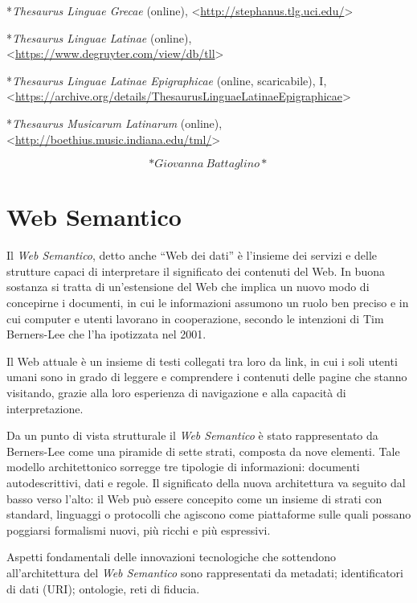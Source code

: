 \documentclass[
  b5paper,
  twoside,
  12pt,
  chapterprefix=false,
  bibliography=totocnumbered,
  parskip=false]{scrbook}
\begin{document}
*\emph{Thesaurus Linguae Grecae} (online),
\textless{}\href{http://stephanus.tlg.uci.edu/}{{http://stephanus.tlg.uci.edu/}}\textgreater{}

*\emph{Thesaurus Linguae Latinae} (online),
\textless{}\href{https://www.degruyter.com/view/db/tll}{{https://www.degruyter.com/view/db/tll}}\textgreater{}

*\emph{Thesaurus Linguae Latinae Epigraphicae} (online, scaricabile), I,
\textless{}\href{https://archive.org/details/ThesaurusLinguaeLatinaeEpigraphicae}{{https://archive.org/details/ThesaurusLinguaeLatinaeEpigraphicae}}\textgreater{}

*\emph{Thesaurus Musicarum Latinarum} (online),
\textless{}\href{http://boethius.music.indiana.edu/tml/}{{http://boethius.music.indiana.edu/tml/}}\textgreater{}

\[*Giovanna~Battaglino*\]

\hypertarget{web-semantico}{%
\chapter{Web Semantico}\label{web-semantico}}

Il \emph{Web Semantico}, detto anche \enquote{Web dei dati} è l'insieme dei servizi
e delle strutture capaci di interpretare il significato dei contenuti
del Web. In buona sostanza si tratta di un'estensione del Web che
implica un nuovo modo di concepirne i documenti, in cui le informazioni
assumono un ruolo ben preciso e in cui computer e utenti lavorano in
cooperazione, secondo le intenzioni di Tim Berners-Lee che l'ha
ipotizzata nel 2001.

Il Web attuale è un insieme di testi collegati tra loro da link, in cui
i soli utenti umani sono in grado di leggere e comprendere i contenuti
delle pagine che stanno visitando, grazie alla loro esperienza di
navigazione e alla capacità di interpretazione.

Da un punto di vista strutturale il \emph{Web Semantico} è stato
rappresentato da Berners-Lee come una piramide di sette strati, composta
da nove elementi. Tale modello architettonico sorregge tre tipologie di
informazioni: documenti autodescrittivi, dati e regole. Il significato
della nuova architettura va seguito dal basso verso l'alto: il Web può
essere concepito come un insieme di strati con standard, linguaggi o
protocolli che agiscono come piattaforme sulle quali possano poggiarsi
formalismi nuovi, più ricchi e più espressivi.

Aspetti fondamentali delle innovazioni tecnologiche che sottendono
all'architettura del \emph{Web Semantico} sono rappresentati da metadati;
identificatori di dati (URI); ontologie, reti di fiducia.
\end{document}
